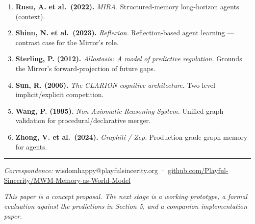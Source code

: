 \documentclass[12pt]{article}
\begin{document}
\begin{enumerate}
  \textbf{Rosenthal, D. (2005).} \emph{Consciousness and Mind.} Higher-Order Thought theory --- Mirror as HOT implementation.
\item
  \textbf{Rusu, A. et al.~(2022).} \emph{MIRA.} Structured-memory long-horizon agents (context).
\item
  \textbf{Shinn, N. et al.~(2023).} \emph{Reflexion.} Reflection-based agent learning --- contrast case for the Mirror's role.
\item
  \textbf{Sterling, P. (2012).} \emph{Allostasis: A model of predictive regulation.} Grounds the Mirror's forward-projection of future gaps.
\item
  \textbf{Sun, R. (2006).} \emph{The CLARION cognitive architecture.} Two-level implicit/explicit competition.
\item
  \textbf{Wang, P. (1995).} \emph{Non-Axiomatic Reasoning System.} Unified-graph validation for procedural/declarative merger.
\item
  \textbf{Zhong, V. et al.~(2024).} \emph{Graphiti / Zep.} Production-grade graph memory for agents.
\end{enumerate}

\begin{center}\rule{0.5\linewidth}{0.5pt}\end{center}

\emph{Correspondence:} wisdomhappy@playfulsincerity.org · \href{https://github.com/Playful-Sincerity/MWM-Memory-as-World-Model}{github.com/Playful-Sincerity/MWM-Memory-as-World-Model}

\emph{This paper is a concept proposal. The next stage is a working prototype, a formal evaluation against the predictions in Section 5, and a companion implementation paper.}
\end{document}
